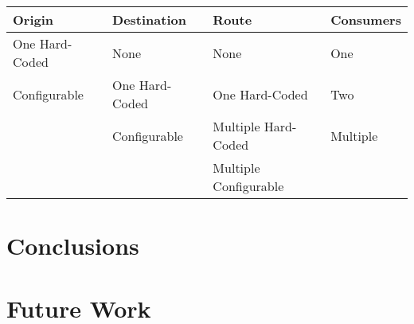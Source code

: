 \documentclass[a4paper, 12pt]{article}
\begin{document}
\begin{table}
    \begin{tabular}{|l|l|l|l|}
    \hline
    Origin         & Destination    & Route                 & Consumers \\ \hline
    One Hard-Coded & None           & None                  & One       \\
    Configurable   & One Hard-Coded & One Hard-Coded        & Two       \\
    ~              & Configurable   & Multiple Hard-Coded   & Multiple  \\
    ~              & ~              & Multiple Configurable & ~         \\ \hline
    \end{tabular}
\end{table}

\section{Conclusions}
\label{sec:conclusions}

\newpage

\section{Future Work}

\newpage

\sloppy
\printbibliography
\end{document}
